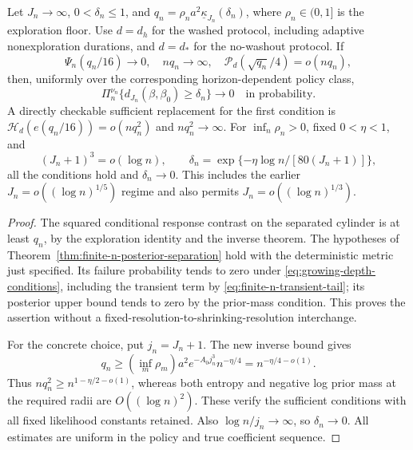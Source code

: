 \begin{theorem}
\label{thm:growing-depth-recovery}
Let \(J_n\to\infty\), \(0<\delta_n\le1\), and
\(q_n=\rho_n a^2\underline\kappa_{J_n}(\delta_n)\), where
\(\rho_n\in(0,1]\) is the exploration floor. Use \(d=d_h\) for the
washed protocol, including adaptive nonexploration durations, and \(d=d_*\)
for the no-washout protocol. If
\begin{equation}
 \Psi_n(q_n/16)\to0,\quad nq_n\to\infty,\quad
 \mathcal P_d(\sqrt{q_n}/4)=o(nq_n),
 \label{eq:growing-depth-conditions}
\end{equation}
then, uniformly over the corresponding horizon-dependent policy class,
\[
 \Pi_n^{\nu_n}\{d_{J_n}(\beta,\beta_0)\ge\delta_n\}\longrightarrow0
 \quad\text{in probability}.
\]
A directly checkable sufficient replacement for the first condition is
\(\mathcal H_d(e(q_n/16))=o(nq_n^2)\) and \(nq_n^2\to\infty\).
For \(\inf_n\rho_n>0\), fixed \(0<\eta<1\), and
\begin{equation}
 (J_n+1)^3=o(\log n),\qquad
 \delta_n=\exp\{-\eta\log n/[80(J_n+1)]\},
 \label{eq:explicit-shrinking-radius}
\end{equation}
all the conditions hold and \(\delta_n\to0\). This includes the earlier
\(J_n=o((\log n)^{1/5})\) regime and also permits
\(J_n=o((\log n)^{1/3})\).
\end{theorem}
\begin{proof}
The squared conditional response contrast on the separated cylinder is at
least \(q_n\), by the exploration identity and the inverse theorem.
The hypotheses of Theorem~\ref{thm:finite-n-posterior-separation} hold with
the deterministic metric just specified. Its failure probability tends to
zero under \eqref{eq:growing-depth-conditions}, including the transient term
by \eqref{eq:finite-n-transient-tail}; its posterior upper bound tends to
zero by the prior-mass condition. This proves the assertion without a
fixed-resolution-to-shrinking-resolution interchange.

For the concrete choice, put \(j_n=J_n+1\). The new inverse bound gives
\[
 q_n\ge (\inf_m\rho_m)a^2e^{-A_0j_n^3}n^{-\eta/4}
       =n^{-\eta/4-o(1)}.
\]
Thus \(nq_n^2\ge n^{1-\eta/2-o(1)}\), whereas both entropy and negative
log prior mass at the required radii are \(O((\log n)^2)\).
These verify the sufficient conditions with all fixed likelihood constants
retained. Also \(\log n/j_n\to\infty\), so \(\delta_n\to0\).
All estimates are uniform in the policy and true coefficient sequence.
\end{proof}

